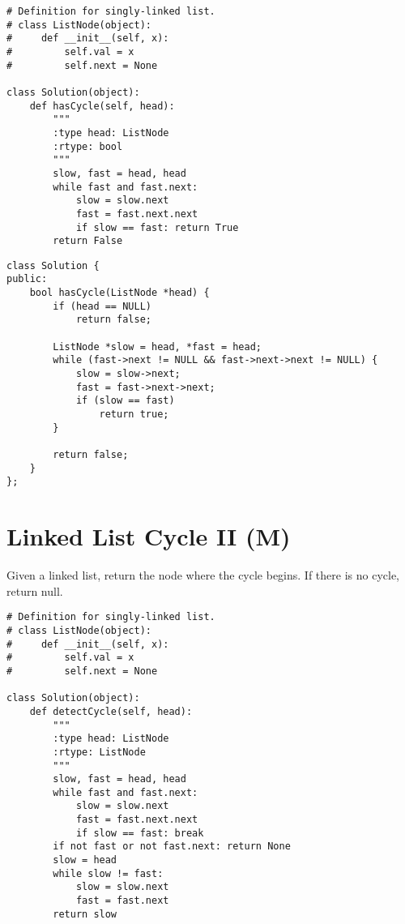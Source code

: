 \begin{lstlisting}
# Definition for singly-linked list.
# class ListNode(object):
#     def __init__(self, x):
#         self.val = x
#         self.next = None

class Solution(object):
    def hasCycle(self, head):
        """
        :type head: ListNode
        :rtype: bool
        """
        slow, fast = head, head
        while fast and fast.next:
            slow = slow.next
            fast = fast.next.next
            if slow == fast: return True
        return False
\end{lstlisting}            

\begin{lstlisting}
class Solution {
public:
    bool hasCycle(ListNode *head) {
        if (head == NULL)
            return false;
            
        ListNode *slow = head, *fast = head;
        while (fast->next != NULL && fast->next->next != NULL) {
            slow = slow->next;
            fast = fast->next->next;
            if (slow == fast)
                return true;
        }
        
        return false;
    }
};
\end{lstlisting}


\section{Linked List Cycle II (M)}
Given a linked list, return the node where the cycle begins. If there is no cycle, return null. \\
 
 \begin{lstlisting}
# Definition for singly-linked list.
# class ListNode(object):
#     def __init__(self, x):
#         self.val = x
#         self.next = None

class Solution(object):
    def detectCycle(self, head):
        """
        :type head: ListNode
        :rtype: ListNode
        """
        slow, fast = head, head
        while fast and fast.next:
            slow = slow.next
            fast = fast.next.next
            if slow == fast: break
        if not fast or not fast.next: return None
        slow = head
        while slow != fast:
            slow = slow.next
            fast = fast.next
        return slow
\end{lstlisting}
 
